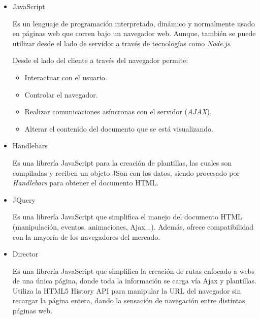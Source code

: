 \begin{itemize}
        \item JavaScript

            Es un lenguaje de programación interpretado, dinámico y normalmente usado en páginas web que corren bajo un navegador web. Aunque, también se puede utilizar desde el lado de servidor a través de tecnologías como \emph{Node.js}.

            Desde el lado del cliente a través del navegador permite:

                \begin{itemize}
                    \item Interactuar con el usuario.
                    \item Controlar el navegador.
                    \item Realizar comunicaciones asíncronas con el servidor (\emph{AJAX}).
                    \item Alterar el contenido del documento que se está visualizando.
                \end{itemize}

        \item Handlebars

            Es una librería JavaScript para la creación de plantillas, las cuales son compiladas y reciben un objeto JSon con los datos, siendo procesado por \emph{Handlebars} para obtener el documento HTML.

        \item JQuery

            Es una librería JavaScript que simplifica el manejo del documento HTML (manipulación, eventos, animaciones, Ajax...). Además, ofrece compatibilidad con la mayoría de los navegadores del mercado.

        \item Director

            Es una librería JavaScript que simplifica la creación de rutas enfocado a webs de una única página, donde toda la información se carga vía Ajax y plantillas. Utiliza la HTML5 History API para manipular la URL del navegador sin recargar la página entera, dando la sensación de navegación entre distintas páginas web.

    \end{itemize}